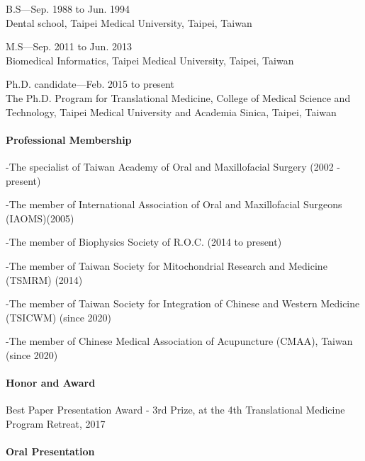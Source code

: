 \begin{vita}
B.S---Sep. 1988 to Jun. 1994\\
Dental school, Taipei Medical University, Taipei, Taiwan

M.S---Sep. 2011 to Jun. 2013\\
Biomedical Informatics, Taipei Medical University, Taipei, Taiwan

Ph.D. candidate---Feb. 2015 to present\\
The Ph.D. Program for Translational Medicine, College of Medical Science and Technology, Taipei Medical University and Academia Sinica, Taipei, Taiwan

\pagebreak

\paragraph*{Professional Membership}

-The specialist of Taiwan Academy of Oral and Maxillofacial Surgery (2002 - present)

-The member of International Association of Oral and Maxillofacial Surgeons (IAOMS)(2005)

-The member of Biophysics Society of R.O.C. (2014 to present)

-The member of Taiwan Society for Mitochondrial Research and Medicine (TSMRM) (2014)

-The member of Taiwan Society for Integration of Chinese and Western Medicine (TSICWM) (since 2020)

-The member of Chinese Medical Association of Acupuncture (CMAA), Taiwan (since 2020)

\paragraph*{Honor and Award}
Best Paper Presentation Award - 3rd Prize, at the 4th Translational Medicine Program Retreat, 2017


\paragraph*{Oral Presentation}
\begin{outline}



\end{outline}
\end{vita}
